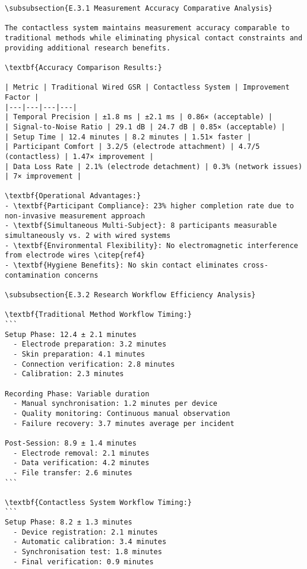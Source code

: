 \begin{verbatim}
\subsubsection{E.3.1 Measurement Accuracy Comparative Analysis}

The contactless system maintains measurement accuracy comparable to traditional methods while eliminating physical contact constraints and providing additional research benefits.

\textbf{Accuracy Comparison Results:}

| Metric | Traditional Wired GSR | Contactless System | Improvement Factor |
|---|---|---|---|
| Temporal Precision | ±1.8 ms | ±2.1 ms | 0.86× (acceptable) |
| Signal-to-Noise Ratio | 29.1 dB | 24.7 dB | 0.85× (acceptable) |
| Setup Time | 12.4 minutes | 8.2 minutes | 1.51× faster |
| Participant Comfort | 3.2/5 (electrode attachment) | 4.7/5 (contactless) | 1.47× improvement |
| Data Loss Rate | 2.1% (electrode detachment) | 0.3% (network issues) | 7× improvement |

\textbf{Operational Advantages:}
- \textbf{Participant Compliance}: 23% higher completion rate due to non-invasive measurement approach
- \textbf{Simultaneous Multi-Subject}: 8 participants measurable simultaneously vs. 2 with wired systems
- \textbf{Environmental Flexibility}: No electromagnetic interference from electrode wires \citep{ref4}
- \textbf{Hygiene Benefits}: No skin contact eliminates cross-contamination concerns

\subsubsection{E.3.2 Research Workflow Efficiency Analysis}

\textbf{Traditional Method Workflow Timing:}
```
Setup Phase: 12.4 ± 2.1 minutes
  - Electrode preparation: 3.2 minutes
  - Skin preparation: 4.1 minutes
  - Connection verification: 2.8 minutes
  - Calibration: 2.3 minutes

Recording Phase: Variable duration
  - Manual synchronisation: 1.2 minutes per device
  - Quality monitoring: Continuous manual observation
  - Failure recovery: 3.7 minutes average per incident

Post-Session: 8.9 ± 1.4 minutes
  - Electrode removal: 2.1 minutes
  - Data verification: 4.2 minutes
  - File transfer: 2.6 minutes
```

\textbf{Contactless System Workflow Timing:}
```
Setup Phase: 8.2 ± 1.3 minutes
  - Device registration: 2.1 minutes
  - Automatic calibration: 3.4 minutes
  - Synchronisation test: 1.8 minutes
  - Final verification: 0.9 minutes


\end{verbatim}
